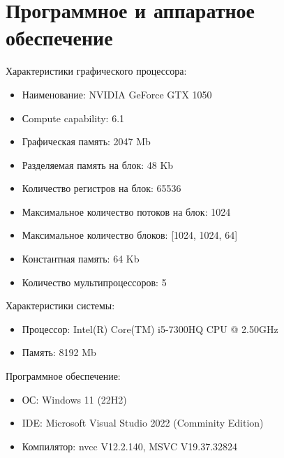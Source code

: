 \section{Программное и аппаратное обеспечение}
Характеристики графического процессора:
\begin{itemize}[noitemsep, topsep=0pt]
	\item Наименование: NVIDIA GeForce GTX 1050
	\item Сompute capability: 6.1
	\item Графическая память: 2047 Mb
	\item Разделяемая память на блок: 48 Kb
	\item Количество регистров на блок: 65536
	\item Максимальное количество потоков на блок: 1024
	\item Максимальное количество блоков: [1024, 1024, 64]
	\item Константная память: 64 Kb
	\item Количество мультипроцессоров: 5
\end{itemize}

Характеристики системы:
\begin{itemize}[noitemsep, topsep=0pt]
	\item Процессор: Intel(R) Core(TM) i5-7300HQ CPU @ 2.50GHz
	\item Память: 8192 Mb
\end{itemize}

Программное обеспечение:
\begin{itemize}[noitemsep, topsep=0pt]
	\item ОС: Windows 11 (22H2) 
	\item IDE: Microsoft Visual Studio 2022 (Comminity Edition)
	\item Компилятор: nvcc V12.2.140, MSVC V19.37.32824
\end{itemize}